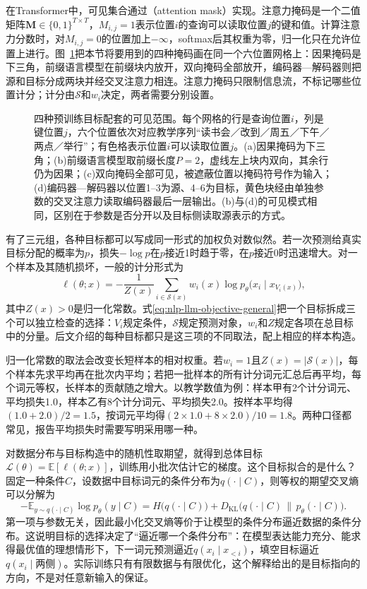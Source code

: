 在Transformer中，可见集合通过（attention mask）实现。注意力掩码是一个二值矩阵$\bm M\in\{0,1\}^{T\times T}$，$M_{i,j}=1$表示位置$i$的查询可以读取位置$j$的键和值。计算注意力分数时，对$M_{i,j}=0$的位置加上$-\infty$，softmax后其权重为零，归一化只在允许位置上进行。图~\ref{fig:nlp-llm-objective-masks}把本节将要用到的四种掩码画在同一个六位置网格上：因果掩码是下三角，前缀语言模型在前缀块内放开，双向掩码全部放开，编码器—解码器则把源和目标分成两块并经交叉注意力相连。注意力掩码只限制信息流，不标记哪些位置计分；计分由$\mathcal S$和$w_i$决定，两者需要分别设置。

\begin{figure}[htbp]
  \centering
  
  \caption{四种预训练目标配套的可见范围。每个网格的行是查询位置$i$，列是键位置$j$，六个位置依次对应教学序列“读书会／改到／周五／下午／两点／举行”；有色格表示位置$i$可以读取位置$j$。(a)因果掩码为下三角；(b)前缀语言模型取前缀长度$P=2$，虚线左上块内双向，其余行仍为因果；(c)双向掩码全部可见，被遮蔽位置以掩码符号作为输入；(d)编码器—解码器以位置1--3为源、4--6为目标，黄色块经由单独参数的交叉注意力读取编码器最后一层输出。(b)与(d)的可见模式相同，区别在于参数是否分开以及目标侧读取源表示的方式。}
  \label{fig:nlp-llm-objective-masks}
\end{figure}

有了三元组，各种目标都可以写成同一形式的加权负对数似然。若一次预测给真实目标分配的概率为$p$，损失$-\log p$在$p$接近1时趋于零，在$p$接近0时迅速增大。对一个样本及其随机损坏，一般的计分形式为
\begin{equation}
 \ell(\theta;x)=
 -\frac{1}{Z(x)}\sum_{i\in\mathcal S(x)}
 w_i(x)\log p_\theta\bigl(x_i\mid x_{V_i(x)}\bigr),
 \label{eq:nlp-llm-objective-general}
\end{equation}
其中$Z(x)>0$是归一化常数。式\eqref{eq:nlp-llm-objective-general}把一个目标拆成三个可以独立检查的选择：$V_i$规定条件，$\mathcal S$规定预测对象，$w_i$和$Z$规定各项在总目标中的分量。后文介绍的每种目标都只是这三项的不同取法，配上相应的样本构造。

归一化常数的取法会改变长短样本的相对权重。若$w_i=1$且$Z(x)=|\mathcal S(x)|$，每个样本先求平均再在批次内平均；若把一批样本的所有计分词元汇总后再平均，每个词元等权，长样本的贡献随之增大。以教学数值为例：样本甲有2个计分词元、平均损失1.0，样本乙有8个计分词元、平均损失2.0。按样本平均得$(1.0+2.0)/2=1.5$，按词元平均得$(2\times1.0+8\times2.0)/10=1.8$。两种口径都常见，报告平均损失时需要写明采用哪一种。

对数据分布与目标构造中的随机性取期望，就得到总体目标$\mathcal L(\theta)=\mathbb E[\ell(\theta;x)]$，训练用小批次估计它的梯度。这个目标拟合的是什么？固定一种条件$C$，设数据中目标词元的条件分布为$q(\cdot\mid C)$，则等权的期望交叉熵可以分解为
\[
 -\mathbb E_{y\sim q(\cdot\mid C)}\log p_\theta(y\mid C)
 =H\bigl(q(\cdot\mid C)\bigr)+D_{\mathrm{KL}}\bigl(q(\cdot\mid C)\,\|\,p_\theta(\cdot\mid C)\bigr).
\]
第一项与参数无关，因此最小化交叉熵等价于让模型的条件分布逼近数据的条件分布。这说明目标的选择决定了“逼近哪一个条件分布”：在模型表达能力充分、能求得最优值的理想情形下，下一词元预测逼近$q(x_i\mid x_{<i})$，填空目标逼近$q(x_i\mid\text{两侧})$。实际训练只有有限数据与有限优化，这个解释给出的是目标指向的方向，不是对任意新输入的保证。

